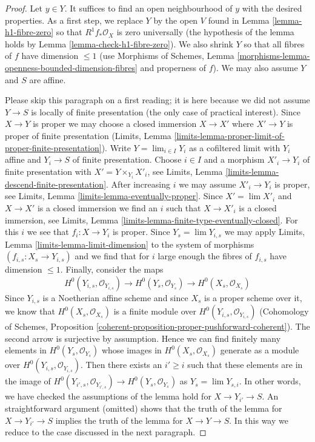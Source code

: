 \begin{proof}
Let $y \in Y$. It suffices to find an open neighbourhood of $y$
with the desired properties. As a first step, we replace $Y$
by the open $V$ found in Lemma \ref{lemma-h1-fibre-zero} so that
$R^1f_*\mathcal{O}_X$ is zero universally (the hypothesis of
the lemma holds by Lemma \ref{lemma-check-h1-fibre-zero}).
We also shrink $Y$ so that all fibres of $f$ have dimension $\leq 1$
(use Morphisms of Schemes, Lemma
\ref{morphisms-lemma-openness-bounded-dimension-fibres}
and properness of $f$).
We may also assume $Y$ and $S$ are affine.

\medskip\noindent
Please skip this paragraph on a first reading; it is here because
we did not assume $Y \to S$ is locally of finite presentation
(the only case of practical interest).
Since $X \to Y$ is proper we may
choose a closed immersion $X \to X'$ where $X' \to Y$ is proper
of finite presentation
(Limits, Lemma \ref{limits-lemma-proper-limit-of-proper-finite-presentation}).
Write $Y = \lim_{i \in I} Y_i$ as a cofiltered limit with $Y_i$
affine and $Y_i \to S$ of finite presentation.
Choose $i \in I$ and a morphism $X'_i \to Y_i$ of finite presentation
with $X' = Y \times_{Y_i} X'_i$, see
Limits, Lemma \ref{limits-lemma-descend-finite-presentation}.
After increasing $i$ we may assume $X'_i \to Y_i$ is proper, see
Limits, Lemma \ref{limits-lemma-eventually-proper}.
Since $X' = \lim X'_i$ and $X \to X'$ is a closed immersion
we find an $i$ such that $X \to X'_i$ is a closed immersion, see
Limits, Lemma \ref{limits-lemma-finite-type-eventually-closed}.
For this $i$ we see that $f_i : X \to Y_i$ is proper.
Since $Y_s = \lim Y_{i, s}$ we may apply Limits, Lemma
\ref{limits-lemma-limit-dimension}
to the system of morphisms $(f_{i, s} : X_s \to Y_{i, s})$
and we find that for $i$ large enough the fibres of $f_{i, s}$
have dimension $\leq 1$. Finally, consider the maps
$$
H^0(Y_{i, s}, \mathcal{O}_{Y_{i, s}}) \to
H^0(Y_s, \mathcal{O}_{Y_s}) \to
H^0(X_s, \mathcal{O}_{X_s})
$$
Since $Y_{i, s}$ is a Noetherian affine scheme and since $X_s$ is a
proper scheme over it, we know that $H^0(X_s, \mathcal{O}_{X_s})$
is a finite module over $H^0(Y_{i, s}, \mathcal{O}_{Y_{i, s}})$
(Cohomology of Schemes, Proposition
\ref{coherent-proposition-proper-pushforward-coherent}).
The second arrow is surjective by assumption. Hence we can find
finitely many elements in $H^0(Y_s, \mathcal{O}_{Y_s})$ whose
images in $H^0(X_s, \mathcal{O}_{X_s})$ generate as a module over
$H^0(Y_{i, s}, \mathcal{O}_{Y_{i, s}})$. Then there exists an
$i' \geq i$ such that these elements are in the image of
$H^0(Y_{i', s}, \mathcal{O}_{Y_{i', s}}) \to
H^0(Y_s, \mathcal{O}_{Y_s})$ as $Y_s = \lim Y_{s, i}$.
In other words, we have checked the assumptions of the lemma hold for
$X \to Y_{i'} \to S$. An straightforward argument (omitted)
shows that the truth of the lemma for $X \to Y_{i'} \to S$
implies the truth of the lemma for $X \to Y \to S$.
In this way we reduce to the case discussed in the next paragraph.


\end{proof}
